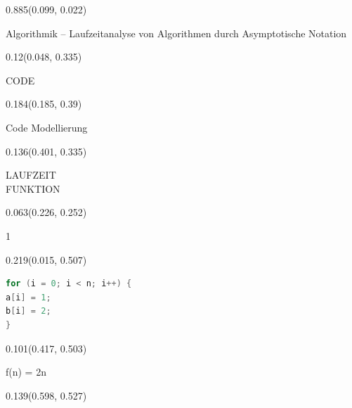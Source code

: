 \documentclass[aspectratio=169]{beamer}
\begin{document}
\begin{frame}[fragile]
\begin{textblock}{0.885}(0.099, 0.022)
  \begin{minipage}[t][0.031\paperheight]{\linewidth}
    \raggedright
    \fontsize{3}{3.3}\selectfont Algorithmik – Laufzeitanalyse von Algorithmen durch Asymptotische Notation
  \end{minipage}
\end{textblock}
\begin{textblock}{0.12}(0.048, 0.335)
  \begin{minipage}[t][0.161\paperheight]{\linewidth}
    CODE
  \end{minipage}
\end{textblock}
\begin{textblock}{0.184}(0.185, 0.39)
  \begin{minipage}[t][0.054\paperheight]{\linewidth}
    Code Modellierung
  \end{minipage}
\end{textblock}
\begin{textblock}{0.136}(0.401, 0.335)
  \begin{minipage}[t][0.161\paperheight]{\linewidth}
    LAUFZEIT\\FUNKTION
  \end{minipage}
\end{textblock}
\begin{textblock}{0.063}(0.226, 0.252)
  \begin{minipage}[t][0.111\paperheight]{\linewidth}
    1
  \end{minipage}
\end{textblock}
\begin{textblock}{0.219}(0.015, 0.507)
  \begin{minipage}[t][0.139\paperheight]{\linewidth}
    \begin{lstlisting}[language=Java, basicstyle=\ttfamily\scriptsize]
for (i = 0; i < n; i++) {
a[i] = 1;
b[i] = 2;
}
    \end{lstlisting}
  \end{minipage}
\end{textblock}
\begin{textblock}{0.101}(0.417, 0.503)
  \begin{minipage}[t][0.058\paperheight]{\linewidth}
    f(n) = 2n
  \end{minipage}
\end{textblock}
\begin{textblock}{0.139}(0.598, 0.527)

\end{textblock}
\end{frame}
\end{document}
